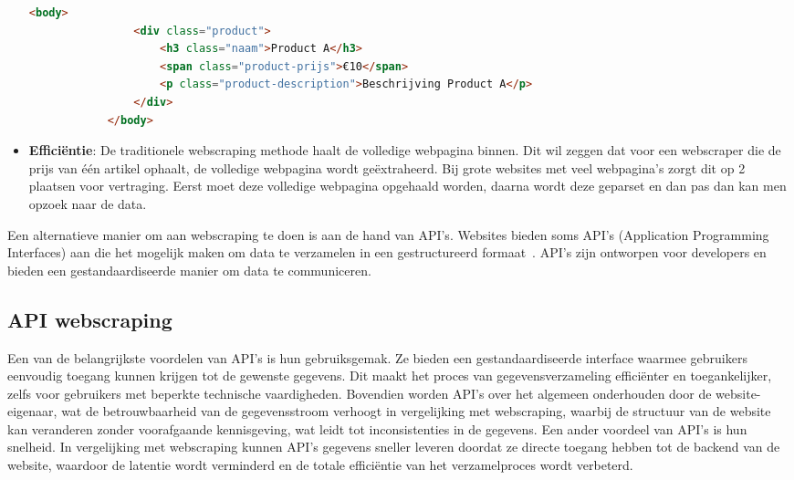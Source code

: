 \begin{itemize}
\begin{listing}
        \begin{lstlisting}[language=HTML,caption={HTML voorbeeld 2},label={code:HTML2}]
            <body>
                <div class="product">
                    <h3 class="naam">Product A</h3>
                    <span class="product-prijs">€10</span>
                    <p class="product-description">Beschrijving Product A</p>
                </div>
            </body>
        \end{lstlisting}
    \end{listing}

    \item \textbf{Efficiëntie}: De traditionele webscraping methode haalt de volledige webpagina binnen. Dit wil zeggen dat voor een webscraper die de prijs van één artikel ophaalt, de volledige webpagina wordt geëxtraheerd. Bij grote websites met veel webpagina's zorgt dit op 2 plaatsen voor vertraging. Eerst moet deze volledige webpagina opgehaald worden, daarna wordt deze geparset en dan pas dan kan men opzoek naar de data.
\end{itemize}

Een alternatieve manier om aan webscraping te doen is aan de hand van API's. Websites bieden soms API's (Application Programming Interfaces) aan die het mogelijk maken om data te verzamelen in een gestructureerd formaat~\autocite{Ayushi2021}. API's zijn ontworpen voor developers en bieden een gestandaardiseerde manier om data te communiceren.

\subsection{API webscraping}

Een van de belangrijkste voordelen van API's is hun gebruiksgemak. Ze bieden een gestandaardiseerde interface waarmee gebruikers eenvoudig toegang kunnen krijgen tot de gewenste gegevens. Dit maakt het proces van gegevensverzameling efficiënter en toegankelijker, zelfs voor gebruikers met beperkte technische vaardigheden. Bovendien worden API's over het algemeen onderhouden door de website-eigenaar, wat de betrouwbaarheid van de gegevensstroom verhoogt in vergelijking met webscraping, waarbij de structuur van de website kan veranderen zonder voorafgaande kennisgeving, wat leidt tot inconsistenties in de gegevens. Een ander voordeel van API's is hun snelheid. In vergelijking met webscraping kunnen API's gegevens sneller leveren doordat ze directe toegang hebben tot de backend van de website, waardoor de latentie wordt verminderd en de totale efficiëntie van het verzamelproces wordt verbeterd.

